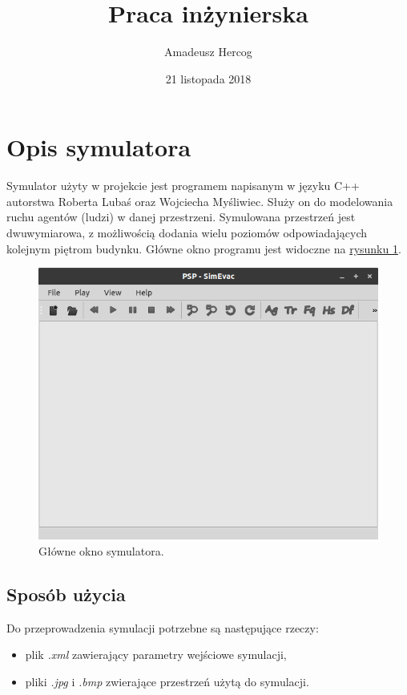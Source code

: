 \documentclass[12pt]{extarticle}
\title{Praca inżynierska}
\author{Amadeusz Hercog}
\date{21 listopada 2018}
\begin{document}
	\maketitle
	
	\newpage
	\section{Opis symulatora}	
	Symulator użyty w projekcie jest programem napisanym w języku C++ autorstwa Roberta Lubaś oraz Wojciecha Myśliwiec. Służy on do modelowania ruchu agentów (ludzi) w danej przestrzeni. Symulowana przestrzeń jest dwuwymiarowa, z możliwością dodania wielu poziomów odpowiadających kolejnym piętrom budynku. Główne okno programu jest widoczne na \hyperref[fig: glowne_okno_symulatora]{rysunku 1}.

	\begin{figure}[h]
 		\includegraphics[width = \linewidth]{rysunki/symulator.png}
		\caption{Główne okno symulatora.}
		\label{fig: glowne_okno_symulatora}
	\end{figure}
	
		\subsection{Sposób użycia}
		Do przeprowadzenia symulacji potrzebne są następujące rzeczy:
		\begin{itemize}
		\item plik \textit{.xml} zawierający parametry wejściowe symulacji,
		\item pliki \textit{.jpg} i \textit{.bmp} zwierające przestrzeń użytą do symulacji.
		\end{itemize}
	
\end{document}
